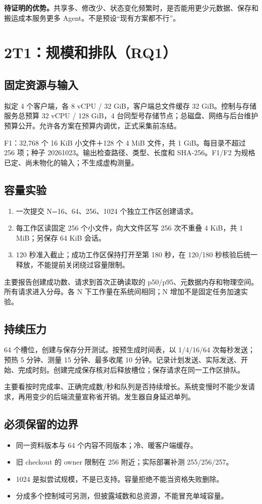 \documentclass[UTF8,11pt,a4paper,fontset=windows]{ctexart}
\begin{document}
\textbf{待证明的优势。}共享多、修改少、状态变化频繁时，是否能用更少元数据、保存和搬运成本服务更多 Agent。不是预设“现有方案都不行”。
\newpage

\section*{2\quad T1：规模和排队（RQ1）}
\subsection*{固定资源与输入}
拟定 4 个客户端，各 8 vCPU / 32 GiB，客户端总文件缓存 32 GiB。控制与存储服务总预算 32 vCPU / 128 GiB，4 台同型号存储节点；总磁盘、网络与后台维护预算公开。允许各方案在预算内调优，正式采集前冻结。

F1：32,768 个 16 KiB 小文件＋128 个 4 MiB 文件，共 1 GiB。每目录不超过 256 项；种子 20261023。输出检查路径、类型、长度和 SHA-256。F1/F2 为规格已定、尚未物化的输入；不生成虚构测量。

\subsection*{容量实验}
\begin{enumerate}
\item 一次提交 N=16、64、256、1024 个独立工作区创建请求。
\item 每工作区读固定 256 个小文件，向大文件区写 256 次不重叠 4 KiB，共 1 MiB；另保存 64 KiB 会话。
\item 120 秒准入截止；成功工作区保持打开至第 180 秒，在 120/180 秒核验后统一释放，不能提前关闭绕过容量限制。
\end{enumerate}
主要报告创建成功数、请求到首次正确读取的 p50/p95、元数据内存和物理空间。所有请求进入分母。各 N 下工作量在系统间相同；N 增加不是固定任务加速实验。

\subsection*{持续压力}
64 个槽位，创建与保存分开测试。按预生成时间表，以 1/4/16/64 次每秒发送；预热 5 分钟、测量 15 分钟、最多收尾 10 分钟。记录计划发送、实际发送、开始、完成时刻。创建完成保存核对后释放槽位；保存请求在同一工作区排队。

主要看按时完成率、正确完成数/秒和队列是否持续增长。系统变慢时不能少发请求，再用变少的后端流量宣称省开销。发生器自身延迟单列。

\subsection*{必须保留的边界}
\begin{itemize}
\item 同一资料版本与 64 个内容不同版本；冷、暖客户端缓存。
\item 旧 checkout 的 owner 限制在 256 附近；实际部署补测 255/256/257。
\item 1024 是拟尝试规模，不是已支持。容量拒绝不能当资格失败删除。
\item 分成多个控制域可另测，但披露域数和总资源，不能冒充单域容量。
\end{itemize}
\end{document}
